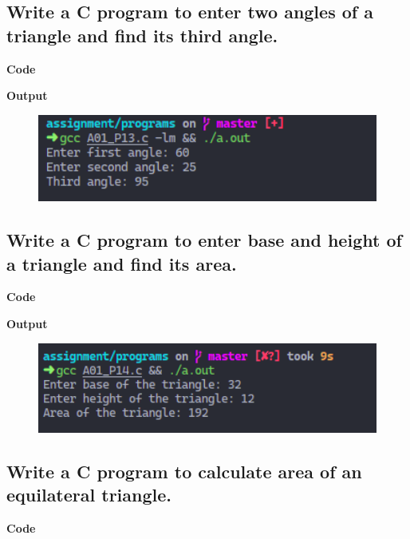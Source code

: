 \documentclass[a4paper]{article}
\begin{document}
\newpage



\subsection{Write a C program to enter two angles of a triangle and find its third angle.}
\textbf{Code}



\textbf{Output}

\begin{figure}[h]
  \includegraphics[width=12cm]{A01_P13}
\end{figure}

\newpage



\subsection{Write a C program to enter base and height of a triangle and find its area.}
\textbf{Code}



\textbf{Output}

\begin{figure}[h]
  \includegraphics[width=12cm]{A01_P14}
\end{figure}

\newpage



\subsection{Write a C program to calculate area of an equilateral triangle.}
\textbf{Code}
\end{document}
